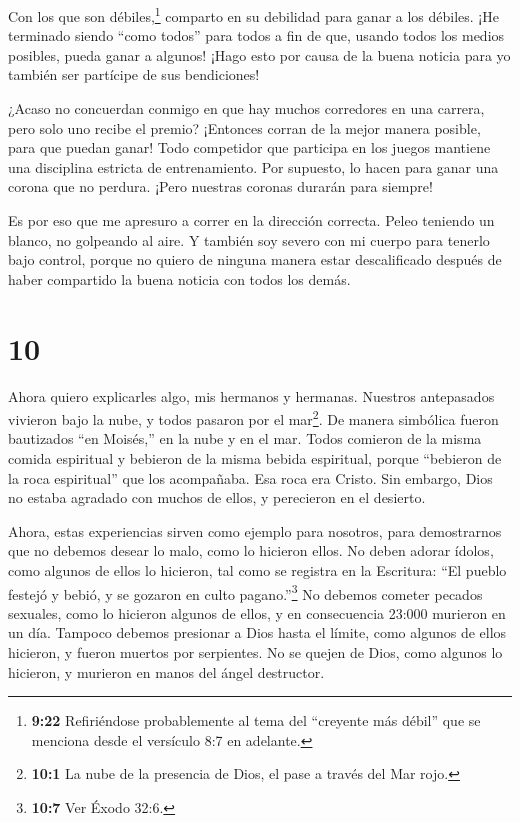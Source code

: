  Con los que son débiles,\footnote{\textbf{9:22}
  Refiriéndose probablemente al tema del ``creyente más débil'' que se
  menciona desde el versículo 8:7 en adelante.} comparto en su debilidad
para ganar a los débiles. ¡He terminado siendo ``como todos'' para todos
a fin de que, usando todos los medios posibles, pueda ganar a algunos!
 ¡Hago esto por causa de la buena noticia para yo también
ser partícipe de sus bendiciones!

 ¿Acaso no concuerdan conmigo en que hay muchos corredores
en una carrera, pero solo uno recibe el premio? ¡Entonces corran de la
mejor manera posible, para que puedan ganar!  Todo
competidor que participa en los juegos mantiene una disciplina estricta
de entrenamiento. Por supuesto, lo hacen para ganar una corona que no
perdura. ¡Pero nuestras coronas durarán para siempre!

 Es por eso que me apresuro a correr en la dirección
correcta. Peleo teniendo un blanco, no golpeando al aire. 
Y también soy severo con mi cuerpo para tenerlo bajo control, porque no
quiero de ninguna manera estar descalificado después de haber compartido
la buena noticia con todos los demás.

\hypertarget{section-9}{%
\section{10}\label{section-9}}

 Ahora quiero explicarles algo, mis hermanos y hermanas.
Nuestros antepasados vivieron bajo la nube, y todos pasaron por el
mar\footnote{\textbf{10:1} La nube de la presencia de Dios, el pase a
  través del Mar rojo.}.  De manera simbólica fueron
bautizados ``en Moisés,'' en la nube y en el mar.  Todos
comieron de la misma comida espiritual  y bebieron de la
misma bebida espiritual, porque ``bebieron de la roca espiritual'' que
los acompañaba. Esa roca era Cristo.  Sin embargo, Dios no
estaba agradado con muchos de ellos, y perecieron en el desierto.

 Ahora, estas experiencias sirven como ejemplo para
nosotros, para demostrarnos que no debemos desear lo malo, como lo
hicieron ellos.  No deben adorar ídolos, como algunos de
ellos lo hicieron, tal como se registra en la Escritura: ``El pueblo
festejó y bebió, y se gozaron en culto pagano.''\footnote{\textbf{10:7}
  Ver Éxodo 32:6.}  No debemos cometer pecados sexuales,
como lo hicieron algunos de ellos, y en consecuencia 23:000 murieron en
un día.  Tampoco debemos presionar a Dios hasta el límite,
como algunos de ellos hicieron, y fueron muertos por serpientes.
 No se quejen de Dios, como algunos lo hicieron, y murieron
en manos del ángel destructor.

